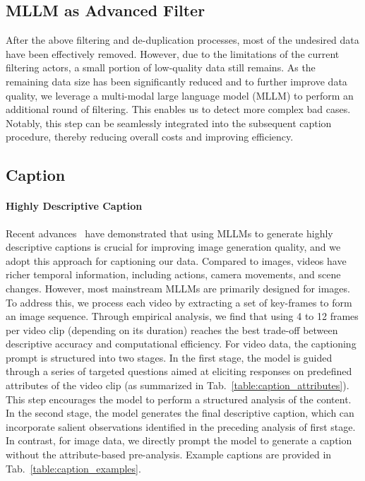 \subsection{MLLM as Advanced Filter}
After the above filtering and de-duplication processes, most of the undesired data have been effectively removed. However, due to the limitations of the current filtering actors, a small portion of low-quality data still remains. As the remaining data size has been significantly reduced and to further improve data quality, we leverage a multi-modal large language model (MLLM) to perform an additional round of filtering. This enables us to detect more complex bad cases. Notably, this step can be seamlessly integrated into the subsequent caption procedure, thereby reducing overall costs and improving efficiency.


\subsection{Caption}
\label{sec:caption}
\paragraph{Highly Descriptive Caption}
Recent advances~\citep{betker2023improving} have demonstrated that using MLLMs to generate highly descriptive captions is crucial for improving image generation quality, and we adopt this approach for captioning our data. Compared to images, videos have richer temporal information, including actions, camera movements, and scene changes. However, most mainstream MLLMs are primarily designed for images. To address this, we process each video by extracting a set of key-frames to form an image sequence. Through empirical analysis, we find that using 4 to 12 frames per video clip (depending on its duration) reaches the best trade-off between descriptive accuracy and computational efficiency.  
For video data, the captioning prompt is structured into two stages. In the first stage, the model is guided through a series of targeted questions aimed at eliciting responses on predefined attributes of the video clip (as summarized in Tab.~\ref{table:caption_attributes}). This step encourages the model to perform a structured analysis of the content. In the second stage, the model generates the final descriptive caption, which can incorporate salient observations identified in the preceding analysis of first stage. In contrast, for image data, we directly prompt the model to generate a caption without the attribute-based pre-analysis. Example captions are provided in Tab.~\ref{table:caption_examples}.

